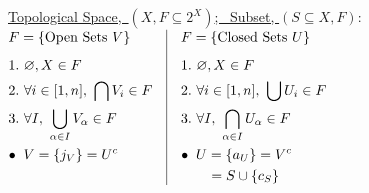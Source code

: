 \documentclass{article}
\newcommand{\nhs}{\hspace{-1pt}} %
\begin{document}
\parindent=0pt



\hrulefill

\vspace{-10pt}
\hrulefill

\vspace{5pt}
\begin{minipage}[t]{.49\textwidth}
    \underline{Topological Space,\ \((X, F \subseteq 2^X)\); \ Subset, \((S \subseteq X, F)\)}:\\[5pt]
    \(
        \begin{aligned}[t]
            & F = \{ \text{Open Sets}\ V\} \\[5pt]
            & 1.\ \varnothing, X \in F\\
            & 2.\ \forall i \in [1,n],\ \bigcap V_i \in F\\
            & 3.\ \forall I,\ \bigcup_{\alpha \in I} V_\alpha \in F\\
            & \nhs\nhs \bullet\ V = \{j_V\} = U^c\\
        \end{aligned}
        \hspace{10pt} \vline \hspace{10pt}
        \begin{aligned}[t]
            & F = \{ \text{Closed Sets}\ U \} \\[5pt]
            & 1.\ \varnothing, X \in F\\
            & 2.\ \forall i \in [1,n],\ \bigcup U_i \in F\\
            & 3.\ \forall I,\ \bigcap_{\alpha \in I} U_\alpha \in F\\
            & \nhs\nhs \bullet\ U = \{a_U\} = V^c \\
            & \hspace{19pt} = S \cup \{c_S\}\\
        \end{aligned}
    \)
\end{minipage}
\hfill
\end{document}
